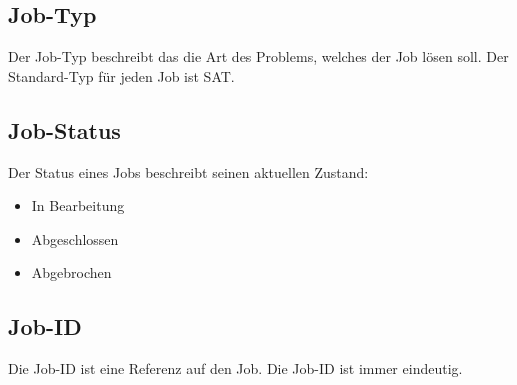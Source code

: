 \subsection{Job-Typ}
\label{B:Job-Typ}
Der Job-Typ beschreibt das die Art des Problems, welches der Job lösen soll. Der Standard-Typ für jeden Job ist SAT.

\subsection{Job-Status}
\label{B:Job-Status}
Der Status eines Jobs beschreibt seinen aktuellen Zustand: 
\begin{itemize}[noitemsep]
    \item In Bearbeitung
    \item Abgeschlossen
    \item Abgebrochen
\end{itemize}

\subsection{Job-ID}
\label{B:Job-ID}
Die Job-ID ist eine Referenz auf den Job. Die Job-ID ist immer eindeutig.
